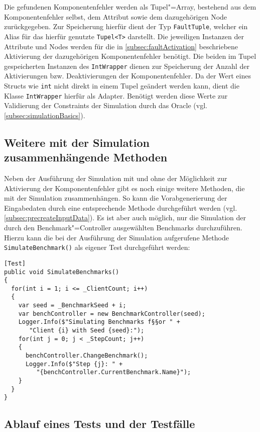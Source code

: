 Die gefundenen Komponentenfehler werden als Tupel"=Array, bestehend aus dem Komponentenfehler selbst, dem Attribut sowie dem dazugehörigen Node zurückgegeben.
Zur Speicherung hierfür dient der Typ \texttt{FaultTuple}, welcher ein Alias für das hierfür genutzte \texttt{Tupel<T>} darstellt.
Die jeweiligen Instanzen der Attribute und Nodes werden für die in \cref{subsec:faultActivation} beschriebene Aktivierung der dazugehörigen Komponentenfehler benötigt.
Die beiden im Tupel gespeicherten Instanzen des \texttt{IntWrapper} dienen zur Speicherung der Anzahl der Aktivierungen bzw. Deaktivierungen der Komponentenfehler.
Da der Wert eines Structs wie \texttt{int} nicht direkt in einem Tupel geändert werden kann, dient die Klasse \texttt{IntWrapper} hierfür als Adapter.
Benötigt werden diese Werte zur Validierung der Constraints der Simulation durch das Oracle (vgl. \cref{subsec:simulationBasics}).

\subsection{Weitere mit der Simulation zusammenhängende Methoden}
\label{subsec:simulationUtilities}

Neben der Ausführung der Simulation mit und ohne der Möglichkeit zur Aktivierung der Komponentenfehler gibt es noch einige weitere Methoden, die mit der Simulation zusammenhängen.
So kann \zB die Vorabgenerierung der Eingabedaten durch eine entsprechende Methode durchgeführt werden (vgl. \cref{subsec:precreateInputData}).
Es ist aber auch möglich, nur die Simulation der durch den Benchmark"=Controller ausgewählten Benchmarks durchzuführen.
Hierzu kann die bei der Ausführung der Simulation aufgerufene Methode \texttt{SimulateBenchmark()} als eigener Test durchgeführt werden:

\begin{lstlisting}[label=lst:hadoopSimulationBenchmarks,style=cs,
caption={Simulation der auszuführenden Benchmarks}]
[Test]
public void SimulateBenchmarks()
{
  for(int i = 1; i <= _ClientCount; i++)
  {
    var seed = _BenchmarkSeed + i;
    var benchController = new BenchmarkController(seed);
    Logger.Info($"Simulating Benchmarks f§§or " +
       "Client {i} with Seed {seed}:");
    for(int j = 0; j < _StepCount; j++)
    {
      benchController.ChangeBenchmark();
      Logger.Info($"Step {j}: " +
         "{benchController.CurrentBenchmark.Name}");
    }
  }
}
\end{lstlisting}

\subsection{Ablauf eines Tests und der Testfälle}
\label{subsec:simulationStep}

